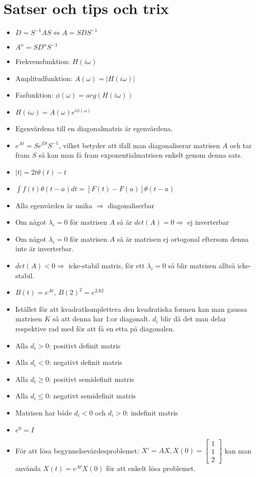 \documentclass[a4paper]{article}
\begin{document}
\section{Satser och tips och trix}
\begin{itemize}
\item $D=S^{-1}AS \Leftrightarrow A=SDS^{-1}$
\item $A^n=SD^{n}S^{-1}$
\item Frekvensfunktion: $H(i\omega)$
\item Amplitudfunktion: $A(\omega)=|H(i\omega)|$
\item Fasfunktion:      $\phi(\omega)=arg(H(i\omega))$
\item $H(i\omega)=A(\omega)e^{i\phi(\omega)}$
\item Egenvärdena till en diagonalmatris är egenvärdena.
\item $e^{At}=Se^{Dt}S^{-1}$, vilket betyder att ifall man diagonaliserar matrisen $A$ och tar fram $S$ så kan man få fram exponentialmatrisen enkelt genom denna sats.
\item $|t|=2t\theta(t)-t$
\item ${\int}f(t)\theta(t-a)dt=[F(t)-F(a)]\theta(t-a)$
\item Alla egenvärden är unika $\Rightarrow$ diagonaliserbar
\item Om något $\lambda_i=0$ för matrisen $A$ så är $det(A)=0\Rightarrow$ ej inverterbar 
\item Om något $\lambda_i=0$ för matrisen $A$ så är matrisen ej ortogonal eftersom denna inte är inverterbar.
\item $det(A)<0\Rightarrow$ icke-stabil matris, för ett $\lambda_i=0$ så blir matrisen alltså icke-stabil.
\item $B(t)=e^{At}$, $B(2)^2=e^{2A2}$
\item Istället för att kvadratkomplettera den kvadratiska formen kan man gaussa matrisen $K$ så att denna har 1:or diagonalt. $d_i$ blir då det man delar respektive rad med för att få en etta på diagonalen.
\item Alla $d_i>0$: positivt definit matris
\item Alla $d_i<0$: negativt definit matris
\item Alla $d_i\geq0$: positivt semidefinit matris
\item Alla $d_i\leq0$: negativt semidefinit matris
\item Matrisen har både $d_i<0$ och $d_i>0$: indefinit matris
\item $e^0 = I$
\item För att lösa begynnelsevärdesproblemet: $X'=AX, X(0)=\begin{bmatrix} 1 \\ 1 \\ 2 \end{bmatrix}$ kan man använda $X(t)=e^{At}X(0)$ för att enkelt lösa problemet.

\end{itemize}
\end{document}

